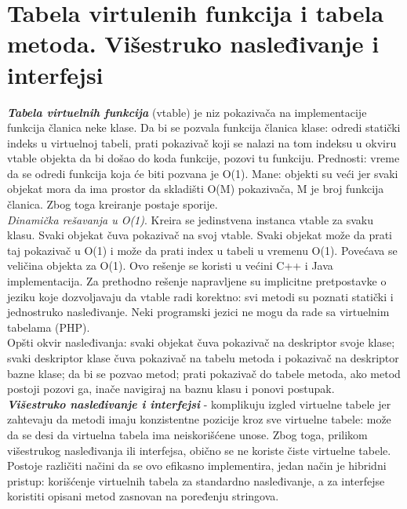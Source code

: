 \documentclass[10pt]{extarticle}
\begin{document}
\section{Tabela virtulenih funkcija i tabela metoda. Višestruko nasleđivanje i interfejsi}
\noindent
\textit{\textbf{Tabela virtuelnih funkcija}} (vtable) je niz pokazivača na implementacije funkcija članica neke klase. Da bi se pozvala funkcija članica klase: odredi statički indeks u virtuelnoj tabeli, prati pokazivač koji se nalazi na tom indeksu u okviru vtable objekta da bi došao do koda funkcije, pozovi tu funkciju. Prednosti: vreme da se odredi funkcija koja će biti pozvana je O(1). Mane: objekti su veći jer svaki objekat mora da ima prostor da skladišti O(M) pokazivača, M je broj funkcija članica. Zbog toga kreiranje postaje sporije. \\
\textit{Dinamička rešavanja u O(1)}. Kreira se jedinstvena instanca vtable za svaku klasu. Svaki objekat čuva pokazivač na svoj vtable. Svaki objekat može da prati taj pokazivač u O(1) i može da prati index u tabeli u vremenu
O(1). Povećava se veličina objekta za O(1). Ovo rešenje se koristi u većini C++ i Java implementacija.
Za prethodno rešenje napravljene su implicitne pretpostavke o jeziku koje dozvoljavaju da vtable radi korektno: svi metodi su poznati statički i jednostruko nasleđivanje. Neki programski jezici ne mogu da rade sa virtuelnim tabelama (PHP).\\
Opšti okvir nasleđivanja: svaki objekat čuva pokazivač na deskriptor svoje klase; svaki deskriptor klase čuva pokazivač na tabelu metoda i pokazivač na deskriptor bazne klase; da bi se pozvao metod; prati pokazivač do tabele metoda, ako metod postoji pozovi ga, inače navigiraj na baznu klasu i ponovi postupak.\\
\textit{\textbf{Višestruko nasleđivanje i interfejsi}} - komplikuju izgled virtuelne tabele jer zahtevaju da metodi imaju konzistentne pozicije kroz sve virtuelne tabele: može da se desi da virtuelna tabela ima neiskorišćene unose. Zbog toga, prilikom višestrukog nasleđivanja ili interfejsa, obično se ne koriste čiste virtuelne tabele. Postoje različiti načini da se ovo efikasno implementira, jedan način je hibridni pristup: korišćenje virtuelnih tabela za standardno nasleđivanje, a za interfejse koristiti opisani metod zasnovan na poređenju stringova. 
\end{document}
